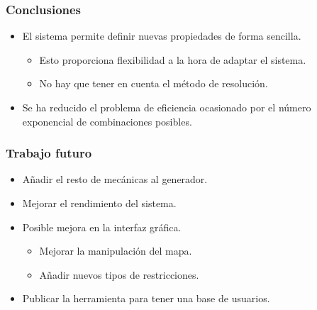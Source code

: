 \begin{frame}
\frametitle{Conclusiones}

\begin{itemize}
	\item<1-> El sistema permite definir \textcolor{UDCpink}{nuevas propiedades} de forma sencilla.
	
	\vspace{1em}
	
	\begin{itemize}
		\item<2-> Esto proporciona \textcolor{UDCpink}{flexibilidad} a la hora de adaptar el sistema.
		
		\vspace{0.5em}
		
		\item<3-> No hay que tener en cuenta el \textcolor{UDCpink}{método de resolución}.
	\end{itemize}

	\vspace{1em}

	\item<4-> Se ha reducido el problema de eficiencia ocasionado por el \textcolor{UDCpink}{número exponencial de combinaciones posibles}.
\end{itemize}

\end{frame}

\begin{frame}
\frametitle{Trabajo futuro}

\begin{itemize}
	\item<1-> Añadir el resto de mecánicas al generador.
	
	\vspace{1em}
	
	\item<2-> Mejorar el rendimiento del sistema.
	
	\vspace{1em}
	
	\item<3-> Posible mejora en la interfaz gráfica.
	
	\vspace{1em}
	
	\begin{itemize}
		\item<4-> Mejorar la manipulación del mapa.
		
		\vspace{0.5em}
		
		\item<5-> Añadir nuevos tipos de restricciones.
	\end{itemize}
	
	\vspace{1em}
	
	\item<6-> Publicar la herramienta para tener una base de usuarios.
\end{itemize}
\end{frame}